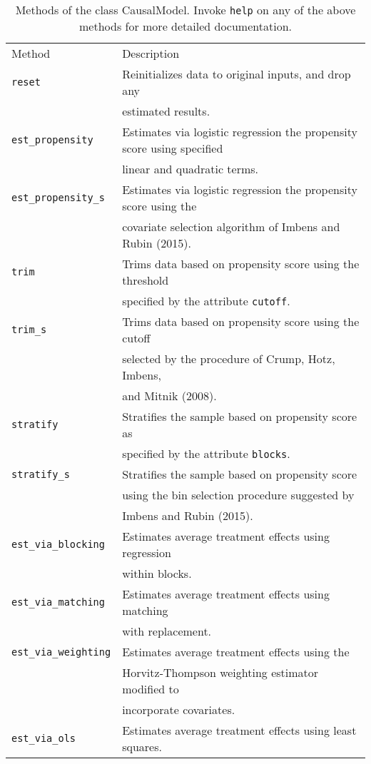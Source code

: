 \documentclass[12pt]{article}
\theoremstyle{definition}
\theoremstyle{definition}
\theoremstyle{definition}
\theoremstyle{remark}
\begin{document}
\begin{table}[h]
\begin{center}\begin{tabular}{ll}
Method & Description \\
\texttt{reset} & Reinitializes data to original inputs, and drop any \\
& estimated results. \\
\texttt{est\_propensity} & Estimates via logistic regression the propensity score using specified \\
& linear and quadratic terms. \\
\texttt{est\_propensity\_s} & Estimates via logistic regression the propensity score using the \\
& covariate selection algorithm of Imbens and Rubin (2015). \\
\texttt{trim} & Trims data based on propensity score using the threshold \\
& specified by the attribute \texttt{cutoff}. \\
\texttt{trim\_s} & Trims data based on propensity score using the cutoff \\
& selected by the procedure of Crump, Hotz, Imbens, \\
& and Mitnik (2008). \\
\texttt{stratify} & Stratifies the sample based on propensity score as \\
& specified by the attribute \texttt{blocks}. \\
\texttt{stratify\_s} & Stratifies the sample based on propensity score \\
& using the bin selection procedure suggested by \\
& Imbens and Rubin (2015). \\
\texttt{est\_via\_blocking} & Estimates average treatment effects using regression \\
& within blocks. \\
\texttt{est\_via\_matching} & Estimates average treatment effects using matching \\
& with replacement. \\
\texttt{est\_via\_weighting} & Estimates average treatment effects using the \\
& Horvitz-Thompson weighting estimator modified to \\
& incorporate covariates. \\
\texttt{est\_via\_ols} & Estimates average treatment effects using least squares.
\end{tabular}\end{center}
\caption{Methods of the class CausalModel. Invoke \texttt{help} on any of the above methods for more detailed documentation.}  \label{tab.b}
\end{table}
\end{document}
